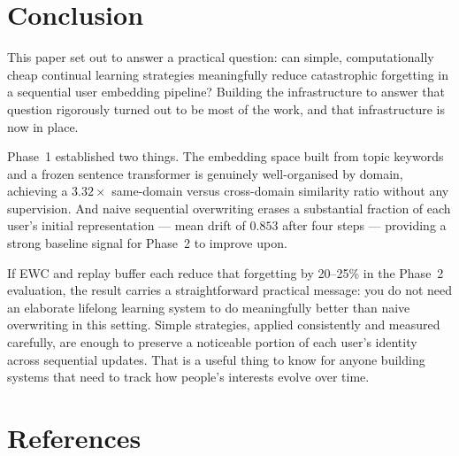 \documentclass[conference]{IEEEtran}
\begin{document}
\section{Conclusion}

This paper set out to answer a practical question: can
simple, computationally cheap continual learning strategies
meaningfully reduce catastrophic forgetting in a sequential
user embedding pipeline? Building the infrastructure to
answer that question rigorously turned out to be most of the
work, and that infrastructure is now in place.

Phase~1 established two things. The embedding space built
from topic keywords and a frozen sentence transformer is
genuinely well-organised by domain, achieving a $3.32\times$
same-domain versus cross-domain similarity ratio without any
supervision. And naive sequential overwriting erases a
substantial fraction of each user's initial representation
--- mean drift of $0.853$ after four steps --- providing a
strong baseline signal for Phase~2 to improve upon.

If EWC and replay buffer each reduce that forgetting by
20--25\% in the Phase~2 evaluation, the result carries a
straightforward practical message: you do not need an
elaborate lifelong learning system to do meaningfully better
than naive overwriting in this setting. Simple strategies,
applied consistently and measured carefully, are enough to
preserve a noticeable portion of each user's identity across
sequential updates. That is a useful thing to know for anyone
building systems that need to track how people's interests
evolve over time.

\newpage
\onecolumn

\section*{References}

\vspace{4pt}
\end{document}
